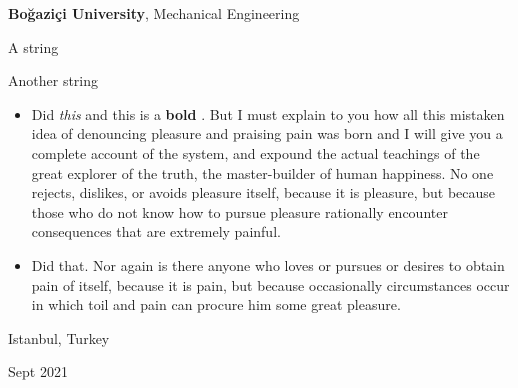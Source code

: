 \documentclass[10pt, letterpaper]{article}
\newenvironment{summary}{
    \begin{description}[
        topsep=0.10 cm,
        parsep=0.10 cm,
        partopsep=0pt,
        itemsep=0pt,
        leftmargin=0.4 cm + 10pt
    ]
}{
    \end{description}
} %
\newenvironment{highlights}{
    \begin{itemize}[
        topsep=0.10 cm,
        parsep=0.10 cm,
        partopsep=0pt,
        itemsep=0pt,
        leftmargin=0.4 cm + 10pt
    ]
}{
    \end{itemize}
} %
\newenvironment{threecolentry}[3][]{
    \onecolentry
    \def\thirdColumn{#3}
    \setcolumnwidth{1 cm, \fill, 4.5 cm}
    \begin{paracol}{3}
    {\raggedright #2} \switchcolumn
}{
    \switchcolumn \raggedleft \thirdColumn
    \end{paracol}
    \endonecolentry
} %
\let\hrefWithoutArrow\href
\renewcommand{\href}[2]{\hrefWithoutArrow{#1}{\ifthenelse{\equal{#2}{}}{ }{#2 }\raisebox{.15ex}{\footnotesize \faExternalLink*}}}
\begin{document}
        \begin{threecolentry}{\textbf{}}{
            Istanbul, Turkey

        Sept 2021
        }
            \textbf{Boğaziçi University}, Mechanical Engineering
            \begin{summary}
                \item A string
                \item Another string
            \end{summary}
            \begin{highlights}
                \item Did \textit{this} and this is a \textbf{bold} \href{https://example.com}{link}. But I must explain to you how all this mistaken idea of denouncing pleasure and praising pain was born and I will give you a complete account of the system, and expound the actual teachings of the great explorer of the truth, the master-builder of human happiness. No one rejects, dislikes, or avoids pleasure itself, because it is pleasure, but because those who do not know how to pursue pleasure rationally encounter consequences that are extremely painful.
                \item Did that. Nor again is there anyone who loves or pursues or desires to obtain pain of itself, because it is pain, but because occasionally circumstances occur in which toil and pain can procure him some great pleasure.
            \end{highlights}
        \end{threecolentry}

        \vspace{0.2 cm}
\end{document}
